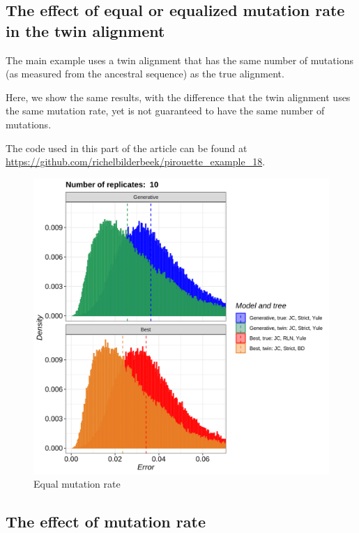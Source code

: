 \subsection{The effect of equal or equalized mutation rate in the twin alignment}
\label{subsec:different_n_mutations}
  
The main example uses a twin alignment that has the same number
of mutations (as measured from the ancestral sequence) as the true alignment.

Here, we show the same results, with the difference that
the twin alignment uses the same mutation rate, yet is not guaranteed
to have the same number of mutations.

The code used in this part of the article can be found at 
\url{https://github.com/richelbilderbeek/pirouette_example_18}.

\begin{figure}[H]
  \includegraphics[width=\textwidth]{pirouette_example_18/errors.png}
  \caption{Equal mutation rate}
\end{figure}

\subsection{The effect of mutation rate}
\label{subsec:mutation_rate}

